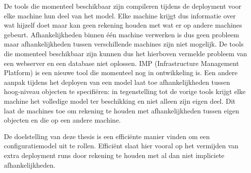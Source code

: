 De tools die momenteel beschikbaar zijn compileren tijdens de deployment voor elke machine hun deel van het model.
Elke machine krijgt dus informatie over wat hijzelf doet maar kan geen rekening houden met wat er op andere machines gebeurt.
Afhankelijkheden binnen \'e\'en machine verwerken is dus geen probleem maar afhankelijkheden tussen verschillende machines zijn niet mogelijk. 
De tools die momenteel beschikbaar zijn kunnen dus het hierboven vermelde probleem van een webserver en een database niet oplossen.
IMP (Infrastructure Management Platform) is een nieuwe tool die momenteel nog in ontwikkeling is.
Een andere aanpak tijdens het deployen van een model laat toe afhankelijkheden tussen hoog-niveau objecten te specifi\"eren:
in tegenstelling tot de vorige tools krijgt elke machine het volledige model ter beschikking en niet alleen zijn eigen deel.
Dit laat de machines toe om rekening te houden met afhankelijkheden tussen eigen objecten en die op een andere machine.

De doelstelling van deze thesis is een effici\"ente manier vinden om een configuratiemodel uit te rollen.
Effici\"ent slaat hier vooral op het vermijden van extra deployment runs door rekening te houden met al dan niet impliciete afhankelijkheden.

